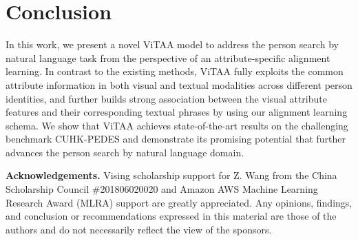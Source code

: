 \documentclass[runningheads]{llncs}
\begin{document}
\section{Conclusion}
In this work, we present a novel ViTAA model to address the person search by natural language task from the perspective of an attribute-specific alignment learning. In contrast to the existing methods, ViTAA fully exploits the common attribute information in both visual and textual modalities across different person identities, and further builds strong association between the visual attribute features and their corresponding textual phrases by using our alignment learning schema. We show that ViTAA achieves state-of-the-art results on the challenging benchmark CUHK-PEDES and demonstrate its promising potential that further advances the person search by natural language domain.

\noindent\textbf{Acknowledgements.}
Vising scholarship support for Z. Wang from the China Scholarship Council \#201806020020 and Amazon AWS Machine Learning Research Award (MLRA) support are greatly appreciated. Any opinions, findings, and conclusion or recommendations expressed in this material are those of the authors and do not necessarily reflect the view of the sponsors. 





\end{document}
